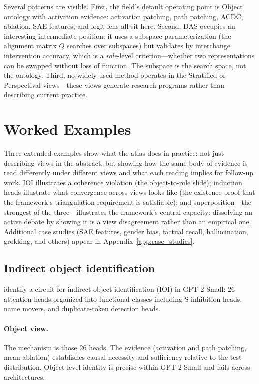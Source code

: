 \documentclass{article}
\begin{document}
Several patterns are visible.  First, the field's default operating point
is Object ontology with activation evidence: activation patching, path
patching, ACDC, ablation, SAE features, and logit lens all sit here.
Second, DAS occupies an interesting intermediate position: it uses a
subspace parameterization (the alignment matrix $Q$ searches over
subspaces) but validates by interchange intervention accuracy, which is a
\emph{role}-level criterion---whether two representations can be swapped
without loss of function.  The subspace is the search space, not the
ontology.  Third, no widely-used method operates in the Stratified or
Perspectival views---these views generate research programs rather than
describing current practice.

\section{Worked Examples}\label{sec:examples}

Three extended examples show what the atlas does in practice: not just
describing views in the abstract, but showing how the same body of
evidence is read differently under different views and what each reading
implies for follow-up work.  IOI illustrates a coherence violation
(the object-to-role slide); induction heads illustrate what convergence
across views looks like (the existence proof that the framework's
triangulation requirement is satisfiable); and superposition---the
strongest of the three---illustrates the framework's central capacity:
dissolving an active debate by showing it is a view disagreement rather
than an empirical one.
Additional case studies (SAE features, gender bias, factual recall,
hallucination, grokking, and others) appear in
Appendix~\ref{app:case_studies}.

\subsection{Indirect object identification}

\citet{wang2022} identify a circuit for indirect object identification
(IOI) in GPT-2 Small: 26 attention heads organized into functional
classes including S-inhibition heads, name movers, and
duplicate-token detection heads.

\paragraph{Object view.}
The mechanism is those 26 heads.  The evidence (activation and path
patching, mean ablation) establishes causal necessity and sufficiency
relative to the test distribution.  Object-level identity is precise
within GPT-2 Small and fails across architectures.
\end{document}
